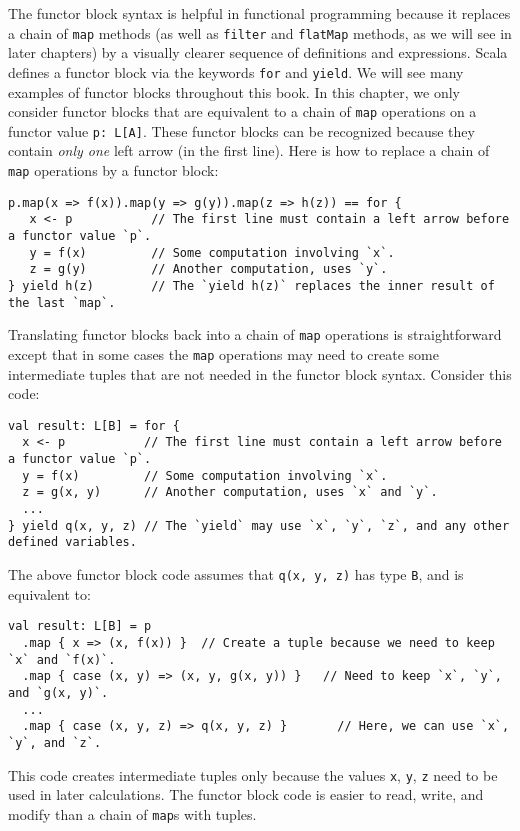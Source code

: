 The functor block syntax is helpful in functional programming because
it replaces a chain of \lstinline!map! methods (as well as \lstinline!filter!
and \lstinline!flatMap! methods, as we will see in later chapters)
by a visually clearer sequence of definitions and expressions. Scala
defines a functor block via the keywords \lstinline!for! and \lstinline!yield!.
We will see many examples of functor blocks throughout this book.
In this chapter, we only consider functor blocks that are equivalent
to a chain of \lstinline!map! operations on a functor value \lstinline!p: L[A]!.
These functor blocks can be recognized because they contain \emph{only
one} left arrow (in the first line). Here is how to replace a chain
of \lstinline!map! operations by a functor block:
\begin{lstlisting}
p.map(x => f(x)).map(y => g(y)).map(z => h(z)) == for {
   x <- p           // The first line must contain a left arrow before a functor value `p`.
   y = f(x)         // Some computation involving `x`.
   z = g(y)         // Another computation, uses `y`.
} yield h(z)        // The `yield h(z)` replaces the inner result of the last `map`.
\end{lstlisting}
Translating functor blocks back into a chain of \lstinline!map! operations
is straightforward except that in some cases the \lstinline!map!
operations may need to create some intermediate tuples that are not
needed in the functor block syntax. Consider this code:
\begin{lstlisting}
val result: L[B] = for {
  x <- p           // The first line must contain a left arrow before a functor value `p`.
  y = f(x)         // Some computation involving `x`.
  z = g(x, y)      // Another computation, uses `x` and `y`.
  ...
} yield q(x, y, z) // The `yield` may use `x`, `y`, `z`, and any other defined variables.
\end{lstlisting}
The above functor block code assumes that \lstinline!q(x, y, z)!
has type \lstinline!B!, and is equivalent to:
\begin{lstlisting}
val result: L[B] = p
  .map { x => (x, f(x)) }  // Create a tuple because we need to keep `x` and `f(x)`.
  .map { case (x, y) => (x, y, g(x, y)) }   // Need to keep `x`, `y`, and `g(x, y)`.
  ...
  .map { case (x, y, z) => q(x, y, z) }       // Here, we can use `x`, `y`, and `z`.
\end{lstlisting}
This code creates intermediate tuples only because the values \lstinline!x!,
\lstinline!y!, \lstinline!z! need to be used in later calculations.
The functor block code is easier to read, write, and modify than a
chain of \lstinline!map!s with tuples. 

